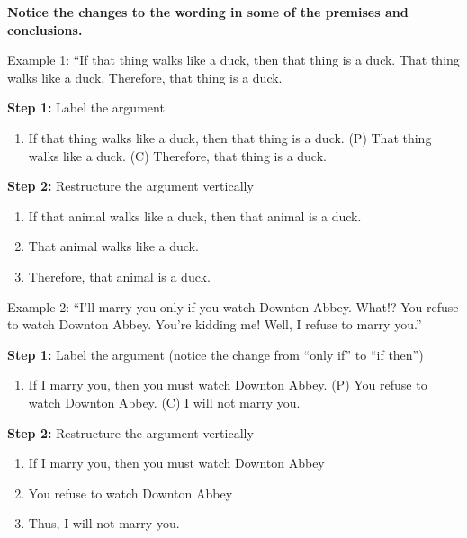 \documentclass[
]{book}
\providecommand{\tightlist}{%
  \setlength{\itemsep}{0pt}\setlength{\parskip}{0pt}}
\begin{document}
\begin{caution}
\textbf{Notice the changes to the wording in some of the premises and conclusions.}
\end{caution}

Example 1:
``If that thing walks like a duck, then that thing is a duck. That thing walks like a duck. Therefore, that thing is a duck.

\textbf{Step 1:} Label the argument

\begin{enumerate}
\def\labelenumi{(\Alph{enumi})}
\setcounter{enumi}{15}
\tightlist
\item
  If that thing walks like a duck, then that thing is a duck. (P) That thing walks like a duck. (C) Therefore, that thing is a duck.
\end{enumerate}

\textbf{Step 2:} Restructure the argument vertically

\begin{enumerate}
\def\labelenumi{\arabic{enumi}.}
\tightlist
\item
  If that animal walks like a duck, then that animal is a duck.\\
\item
  That animal walks like a duck.\\
\item
  Therefore, that animal is a duck.
\end{enumerate}

Example 2:
``I'll marry you only if you watch Downton Abbey. What!? You refuse to watch Downton Abbey. You're kidding me! Well, I refuse to marry you.''

\textbf{Step 1:} Label the argument (notice the change from ``only if'' to ``if then'')

\begin{enumerate}
\def\labelenumi{(\Alph{enumi})}
\setcounter{enumi}{15}
\tightlist
\item
  If I marry you, then you must watch Downton Abbey. (P) You refuse to watch Downton Abbey. (C) I will not marry you.
\end{enumerate}

\textbf{Step 2:} Restructure the argument vertically

\begin{enumerate}
\def\labelenumi{\arabic{enumi}.}
\tightlist
\item
  If I marry you, then you must watch Downton Abbey\\
\item
  You refuse to watch Downton Abbey\\
\item
  Thus, I will not marry you.
\end{enumerate}
\end{document}
